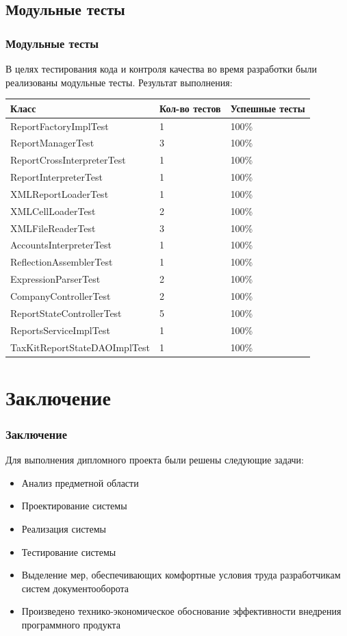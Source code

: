 \documentclass[xcolor=pdftex, dvipsnames, table]{beamer}
\begin{document}
\subsection{Модульные тесты}
\begin{frame}
  \frametitle{Модульные тесты}
  В целях тестирования кода и контроля качества во время разработки были реализованы модульные тесты.
  Результат выполнения:
  \begin{center}
    \small {
      \begin{tabular}{|m{6cm}|m{2cm}|m{2cm}|} \hline
        \textbf{Класс} &
        \textbf{Кол-во тестов} &
        \textbf{Успешные тесты} \\ \hline
        ReportFactoryImplTest & 1 & 100\% \\ \hline
        ReportManagerTest & 3 & 100\% \\ \hline
        ReportCrossInterpreterTest & 1 & 100\% \\ \hline
        ReportInterpreterTest & 1 & 100\% \\ \hline
        XMLReportLoaderTest & 1 & 100\% \\ \hline
        XMLCellLoaderTest & 2 & 100\% \\ \hline
        XMLFileReaderTest & 3 & 100\% \\ \hline
        AccountsInterpreterTest & 1 & 100\% \\ \hline
        ReflectionAssemblerTest & 1 & 100\% \\ \hline
        ExpressionParserTest & 2 & 100\% \\ \hline
        CompanyControllerTest & 2 & 100\% \\ \hline
        ReportStateControllerTest & 5 & 100\%  \\ \hline
        ReportsServiceImplTest & 1 & 100\%  \\ \hline
        TaxKitReportStateDAOImplTest & 1 & 100\%  \\ \hline
      \end{tabular}
    }
  \end{center}
\end{frame}

\section{Заключение}
\begin{frame}
  \frametitle{Заключение}
  Для выполнения дипломного проекта были решены следующие задачи:
  \begin{itemize}
    \item Анализ предметной области
    \item Проектирование системы
    \item Реализация системы
    \item Тестирование системы
    \item Выделение мер, обеспечивающих комфортные условия труда разработчикам систем документооборота
    \item Произведено технико-экономическое обоснование эффективности внедрения программного продукта
  \end{itemize}
\end{frame}
\end{document}
